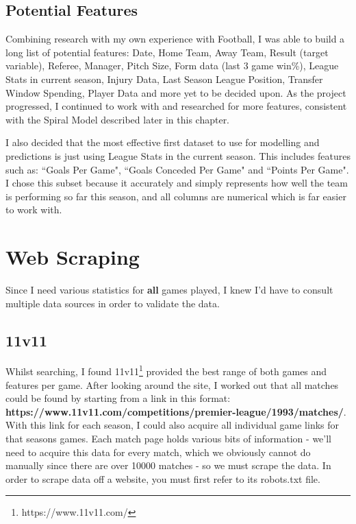\documentclass[12pt,a4paper,twoside,openright]{report}
\begin{document}
\subsection{Potential Features}

Combining research with my own experience with Football, I was able to build a long list of potential features: Date, Home Team, Away Team, Result (target variable), Referee, Manager, Pitch Size, Form data (last 3 game win\%), League Stats in current season, Injury Data, Last Season League Position, Transfer Window Spending, Player Data and more yet to be decided upon. As the project progressed, I continued to work with and researched for more features, consistent with the Spiral Model described later in this chapter.

I also decided that the most effective first dataset to use for modelling and predictions is just using League Stats in the current season. This includes features such as: ``Goals Per Game", ``Goals Conceded Per Game" and ``Points Per Game". I chose this subset because it accurately and simply represents how well the team is performing so far this season, and all columns are numerical which is far easier to work with.

\section{Web Scraping}

Since I need various statistics for \textbf{all} games played, I knew I'd have to consult multiple data sources in order to validate the data.

\subsection{11v11}

Whilst searching, I found 11v11\footnote{https://www.11v11.com/} provided the best range of both games and features per game. After looking around the site, I worked out that all matches could be found by starting from a link in this format: \textbf{https://www.11v11.com/competitions/premier-league/1993/matches/}. With this link for each season, I could also acquire all individual game links for that seasons games. Each match page holds various bits of information - we'll need to acquire this data for every match, which we obviously cannot do manually since there are over 10000 matches - so we must scrape the data. In order to scrape data off a website, you must first refer to its robots.txt file.
\end{document}
